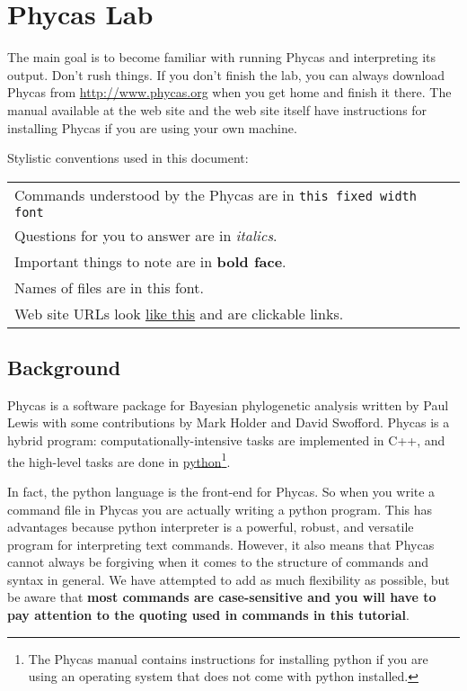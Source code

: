 \documentclass{article}
\newcommand{\cmd}[1]{\texttt{#1}\xspace}
\newcommand{\phycas}{Phycas\xspace}
\newcommand{\localfile}[1]{\textsf{#1}\xspace}
\begin{document}
\tableofcontents


\newpage
\section{\phycas Lab}

The main goal is to become familiar with running \phycas and interpreting its output. 
Don't rush things. 
If you don't finish the lab, you can always download 
\phycas from \url{http://www.phycas.org} when you get home and finish it there.
The manual available at the web site and the web site itself have instructions for 
installing \phycas if you are using your own machine.

Stylistic conventions used in this document:

\begin{tabular}{l}
	Commands understood by the \phycas are in \cmd{this fixed width font} \\
	Questions for you to answer are in {\em italics}. \\
	Important things to note are in {\bf bold face}. \\
	Names of files \localfile{are in  this font}.\\
	Web site URLs look \href{http://www.google.com}{like this} and are clickable links.
\end{tabular}

\subsection{Background}
\phycas is a software package for Bayesian phylogenetic analysis written by Paul Lewis with
some contributions by Mark Holder and David Swofford.
\phycas is a hybrid program: computationally-intensive tasks are implemented in C++, and the high-level
tasks are done in \href{http://www.python.org/}{python}\footnote{The Phycas manual contains instructions for installing python if you are using an operating system
that does not come with python installed.}.

In fact, the python language is the front-end for \phycas. 
So when you write a command file in \phycas you are actually writing a python program.
This has advantages because python interpreter is a powerful, robust, and versatile program for interpreting text commands.
However, it also means that \phycas cannot always be forgiving when it comes to the structure of commands and syntax in general.
We have attempted to add as much flexibility as possible, but be aware that {\bf most commands are case-sensitive and you will have to pay attention to the quoting used in commands in this tutorial}.
\end{document}
